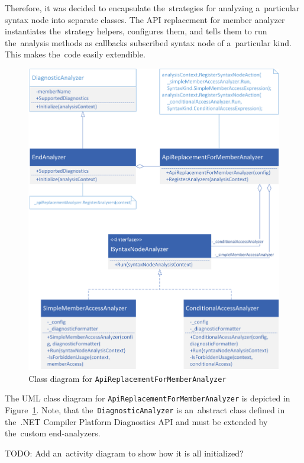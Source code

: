 \documentclass[
  digital, %
  table,   %
  lof,     %
  lot,     %
  oneside,
]{fithesis3}
\begin{document}
Therefore, it was decided to encapsulate the~strategies for analyzing a~particular syntax node into separate classes. The API replacement for member analyzer instantiates the~strategy helpers, configures them, and tells them to run the~analysis methods as callbacks subscribed syntax node of a~particular kind. This makes the~code easily extendible.

\begin{figure}[h!]
		\centering
			\includegraphics[scale=0.8]{img/uml/api-replacement-for-member}
		\caption{Class diagram for \texttt{ApiReplacementForMemberAnalyzer}}
		\label{fig:uml-api-replacement-for-member}
\end{figure}

The UML class diagram for \texttt{ApiReplacementForMemberAnalyzer} is depicted in Figure~\ref{fig:uml-api-replacement-for-member}. Note, that the~\texttt{DiagnosticAnalyzer} is an~abstract class defined in the~.NET Compiler Platform Diagnostics API and must be extended by the~custom end-analyzers.

TODO: Add an~activity diagram to show how it is all initialized?
\end{document}
